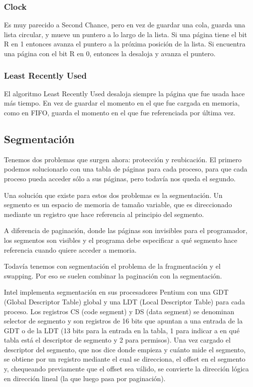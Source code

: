 \documentclass{article}
\begin{document}
\subsubsection{Clock}

Es muy parecido a Second Chance, pero en vez de guardar una cola, guarda una lista circular, y mueve un puntero a lo largo de la lista. Si una p\'agina tiene el bit R en 1 entonces avanza el puntero a la pr\'oxima posici\'on de la lista. Si encuentra una p\'agina con el bit R en 0, entonces la desaloja y avanza el puntero.

\subsubsection{Least Recently Used}

El algoritmo Least Recently Used desaloja siempre la p\'agina que fue usada hace m\'as tiempo. En vez de guardar el momento en el que fue cargada en memoria, como en FIFO, guarda el momento en el que fue referenciada por \'ultima vez.

\subsection{Segmentaci\'on}

Tenemos dos problemas que surgen ahora: protecci\'on y reubicaci\'on. El primero podemos solucionarlo con una tabla de p\'aginas para cada proceso, para que cada proceso pueda acceder s\'olo a sus p\'aginas, pero todav\'ia nos queda el segundo.

Una soluci\'on que existe para estos dos problemas es la segmentaci\'on. Un segmento es un espacio de memoria de tama\~no variable, que es direccionado mediante un registro que hace referencia al principio del segmento.

A diferencia de paginaci\'on, donde las p\'aginas son invisibles para el programador, los segmentos son visibles y el programa debe especificar a qu\'e segmento hace referencia cuando quiere acceder a memoria.

Todav\'ia tenemos con segmentaci\'on el problema de la fragmentaci\'on y el swapping. Por eso se suelen combinar la paginaci\'on con la segmentaci\'on.

Intel implementa segmentaci\'on en sus procesadores Pentium con una GDT (Global Descriptor Table) global y una LDT (Local Descriptor Table) para cada proceso. Los registros CS (code segment) y DS (data segment) se denominan selector de segmento y son registros de 16 bits que apuntan a una entrada de la GDT o de la LDT (13 bits para la entrada en la tabla, 1 para indicar a en qu\'e tabla est\'a el descriptor de segmento y 2 para permisos). Una vez cargado el descriptor del segmento, que nos dice donde empieza y cu\'anto mide el segmento, se obtiene por un registro mediante el cual se direcciona, el offset en el segmento y, chequeando previamente que el offset sea v\'alido, se convierte la direcci\'on l\'ogica en direcci\'on lineal (la que luego pasa por paginaci\'on).
\end{document}
